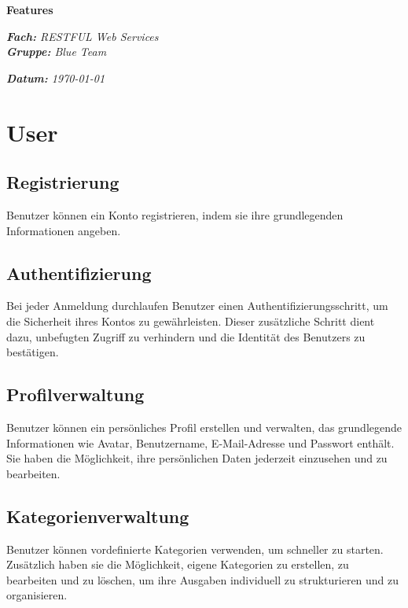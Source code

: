 \documentclass[12pt,a4paper]{article}
\begin{document}
\noindent
{\fontsize{24}{28}\selectfont\bfseries Features} \\
\begin{minipage}[t]{0.7\textwidth}
  \vspace{8pt}
  {\itshape \textbf{Fach:} RESTFUL Web Services} \\
  {\itshape \textbf{Gruppe:} Blue Team}
\end{minipage}
\begin{minipage}[t]{0.3\textwidth}
  \flushright
  \vspace{8pt}
  \itshape \textbf{Datum:} \today
\end{minipage}

\section{User}
\subsection{Registrierung}
Benutzer können ein Konto registrieren, indem sie ihre grundlegenden 
Informationen angeben.

\subsection{Authentifizierung}

Bei jeder Anmeldung durchlaufen Benutzer einen Authentifizierungsschritt, 
um die Sicherheit ihres Kontos zu gewährleisten. Dieser zusätzliche Schritt 
dient dazu, unbefugten Zugriff zu verhindern und die Identität des Benutzers 
zu bestätigen.

\subsection{Profilverwaltung}
Benutzer können ein persönliches Profil erstellen und verwalten, das 
grundlegende Informationen wie Avatar, Benutzername, E-Mail-Adresse 
und Passwort enthält. Sie haben die Möglichkeit, ihre persönlichen Daten 
jederzeit einzusehen und zu bearbeiten.

\subsection{Kategorienverwaltung}

Benutzer können vordefinierte Kategorien verwenden, um schneller zu starten. 
Zusätzlich haben sie die Möglichkeit, eigene Kategorien zu erstellen, zu 
bearbeiten und zu löschen, um ihre Ausgaben individuell zu strukturieren und 
zu organisieren.
\end{document}
